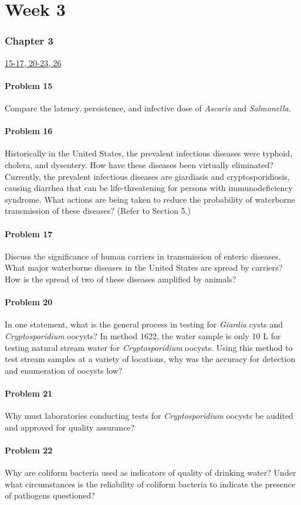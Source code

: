 \part*{Week 3}
\section*{Chapter 3}
\underline{15-17, 20-23, 26}
\subsection*{Problem 15}
Compare the latency, persistence, and infective dose of \emph{Ascaris} and \emph{Salmonella}.
\subsection*{Problem 16}
Historically in the United States, the prevalent infectious diseases were typhoid, cholera, and dysentery. How have these diseases been virtually eliminated? Currently, the prevalent infectious diseases are giardiasis and cryptosporidiosis, causing diarrhea that can be life-threatening for persons with immunodeficiency syndrome. What actions are being taken to reduce the probability of waterborne transmission of these diseases? (Refer to Section 5.)
\subsection*{Problem 17}
Discuss the significance of human carriers in transmission of enteric diseases. What major waterborne diseases in the United States are spread by carriers? How is the spread of two of these diseases amplified by animals?
\subsection*{Problem 20}
In one statement, what is the general process in testing for \emph{Giardia} cysts and \emph{Cryptosporidium} oocysts? In method 1622, the water sample is only 10 L for testing natural stream water for \emph{Cryptosporidium} oocysts. Using this method to test stream samples at a variety of locations, why was the accuracy for detection and enumeration of oocysts low?
\subsection*{Problem 21}
Why must laboratories conducting tests for \emph{Cryptosporidium} oocysts be audited and approved for quality assurance?
\subsection*{Problem 22}
Why are coliform bacteria used as indicators of quality of drinking water? Under what circumstances is the reliability of coliform bacteria to indicate the presence of pathogens questioned?
